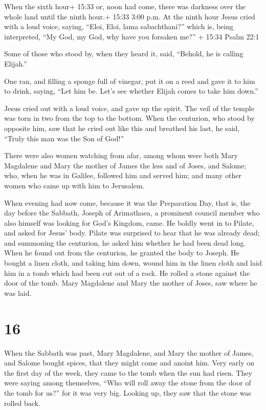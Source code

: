  When the sixth hour+ 15:33 or, noon had come, there was
darkness over the whole land until the ninth hour.+ 15:33 3:00 p.m.
 At the ninth hour Jesus cried with a loud voice, saying,
``Eloi, Eloi, lama sabachthani?'' which is, being interpreted, ``My God,
my God, why have you forsaken me?'' + 15:34 Psalm 22:1

 Some of those who stood by, when they heard it, said,
``Behold, he is calling Elijah.''

 One ran, and filling a sponge full of vinegar, put it on a
reed and gave it to him to drink, saying, ``Let him be. Let's see
whether Elijah comes to take him down.''

 Jesus cried out with a loud voice, and gave up the spirit.
 The veil of the temple was torn in two from the top to the
bottom.  When the centurion, who stood by opposite him, saw
that he cried out like this and breathed his last, he said, ``Truly this
man was the Son of God!''

 There were also women watching from afar, among whom were
both Mary Magdalene and Mary the mother of James the less and of Joses,
and Salome;  who, when he was in Galilee, followed him and
served him; and many other women who came up with him to Jerusalem.

 When evening had now come, because it was the Preparation
Day, that is, the day before the Sabbath,  Joseph of
Arimathaea, a prominent council member who also himself was looking for
God's Kingdom, came. He boldly went in to Pilate, and asked for Jesus'
body.  Pilate was surprised to hear that he was already
dead; and summoning the centurion, he asked him whether he had been dead
long.  When he found out from the centurion, he granted the
body to Joseph.  He bought a linen cloth, and taking him
down, wound him in the linen cloth and laid him in a tomb which had been
cut out of a rock. He rolled a stone against the door of the tomb.
 Mary Magdalene and Mary the mother of Joses, saw where he
was laid.

\hypertarget{section-15}{%
\section{16}\label{section-15}}

 When the Sabbath was past, Mary Magdalene, and Mary the
mother of James, and Salome bought spices, that they might come and
anoint him.  Very early on the first day of the week, they
came to the tomb when the sun had risen.  They were saying
among themselves, ``Who will roll away the stone from the door of the
tomb for us?''  for it was very big. Looking up, they saw
that the stone was rolled back.

